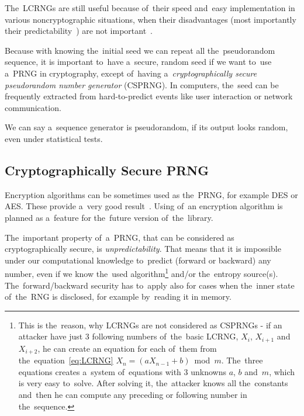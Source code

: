 \par{
The~LCRNGs are still useful because of~their speed and~easy implementation 
in various noncryptographic situations, when their disadvantages 
(most importantly their predictability~\cite[p.~152, 153]
{CryptographyAndNetworkSecurity}) 
are not important~\cite[chapter~16.1]{AppliedCryptography}.
}

\par{
Because with knowing the~initial seed we can repeat all the~pseudorandom 
sequence, it is important to~have a~secure, random seed if we want to~use 
a~PRNG in cryptography, except of~having a~{\em cryptographically secure 
pseudorandom number generator} (CSPRNG). In computers, the~seed 
can be frequently extracted from hard-to-predict events like user interaction 
or network communication.
}

\par{
We can say a~sequence generator is pseudorandom, if its output looks random, 
even under statistical tests.
}

\subsection{Cryptographically Secure PRNG}
\par{
Encryption algorithms can be sometimes used as the~PRNG,
 for example DES or AES. These provide a~very good 
 result~\cite[p.~153-156]{CryptographyAndNetworkSecurity}. 
 Using of~an encryption algorithm is planned as a~feature for the~future version 
 of~the~library.
}

\par{
The~important property of~a~PRNG, that can be considered as cryptographically 
secure, is {\em unpredictability}. That means that it is impossible under our 
computational knowledge to~predict (forward or backward) any number, even if 
we know the~used algorithm\footnote{This is the~reason, why LCRNGs are not 
considered as CSPRNGs - if an attacker have just 3 following numbers 
of~the~basic LCRNG, $X_{i}$, $X_{i+1}$ and~$X_{i+2}$, he can create 
an equation for each of~them from the~equation~\ref{eq:LCRNG} 
$X_n = (aX_{n-1} + b)$~mod~$m$. The~three equations creates a~system 
of~equations with 3 unknowns $a$, $b$ and~$m$, which is very easy to~solve. 
After solving it, the~attacker knows all the~constants and~then he can compute 
any preceding or following number in the~sequence.} and/or the~entropy 
source(s). The~forward/backward security has to~apply also for cases when 
the~inner state of~the~RNG is disclosed, for example by~reading it in memory.
}

